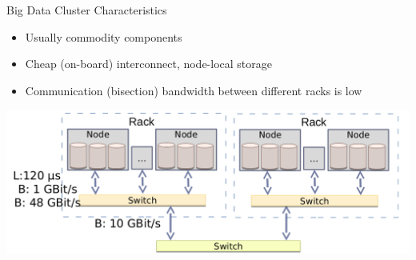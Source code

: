 \documentclass[compress,11pt,xcolor=svgnames,aspectratio=169]{beamer}
\begin{document}
\begin{frame}[fragile]{Big Data Cluster Characteristics}

\begin{itemize}
\setlength\itemsep{0.2cm}

  \item Usually commodity components
  \item Cheap (on-board) interconnect, node-local storage
  \item Communication (bisection) bandwidth between different racks is low

\end{itemize}

\begin{center}
\includegraphics[scale=0.45]{fig/arch1}
\end{center}

\end{frame}
\end{document}
